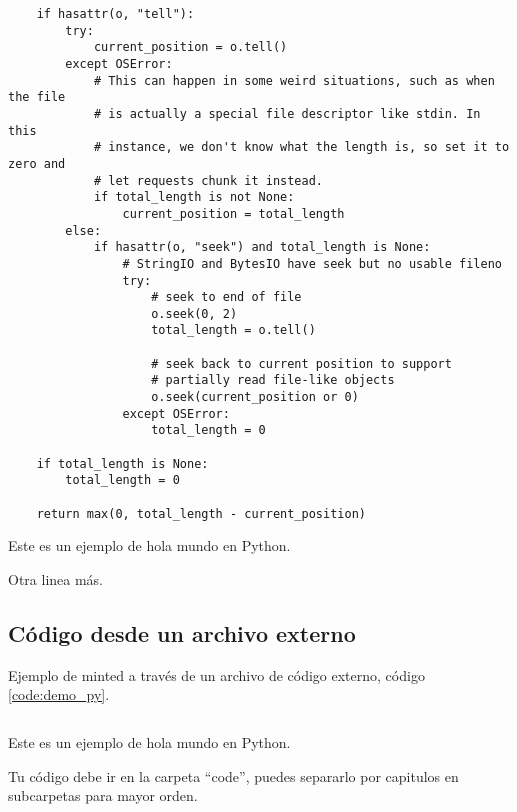 \begin{code}
\begin{verbatim}
    if hasattr(o, "tell"):
        try:
            current_position = o.tell()
        except OSError:
            # This can happen in some weird situations, such as when the file
            # is actually a special file descriptor like stdin. In this
            # instance, we don't know what the length is, so set it to zero and
            # let requests chunk it instead.
            if total_length is not None:
                current_position = total_length
        else:
            if hasattr(o, "seek") and total_length is None:
                # StringIO and BytesIO have seek but no usable fileno
                try:
                    # seek to end of file
                    o.seek(0, 2)
                    total_length = o.tell()

                    # seek back to current position to support
                    # partially read file-like objects
                    o.seek(current_position or 0)
                except OSError:
                    total_length = 0

    if total_length is None:
        total_length = 0

    return max(0, total_length - current_position)
    \end{verbatim}
    \caption{Este es un ejemplo de hola mundo en Python.}
    \label{code:request_partial}
\end{code}

Otra linea más.

\subsection{Código desde un archivo externo}

Ejemplo de minted a través de un archivo de código externo, código \ref{code:demo_py}.

\begin{code}
    \inputminted[bgcolor=gray_background, xleftmargin=10pt, linenos=true, breaklines, fontsize=\footnotesize]{python}{code/capitulo_1/demo.py}
    \caption{Este es un ejemplo de hola mundo en Python.}
    \label{code:demo_py}
\end{code}

Tu código debe ir en la carpeta ``code'', puedes separarlo 
por capitulos en subcarpetas para mayor orden.